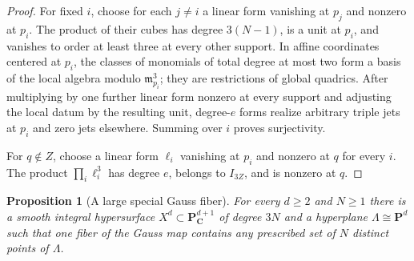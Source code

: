 \documentclass[11pt]{article}
\newtheorem{proposition}[theorem]{Proposition}
\newcommand{\PP}{\mathbf P}
\newcommand{\CC}{\mathbf C}
\begin{document}
\begin{proof}
For fixed $i$, choose for each $j\neq i$ a linear form vanishing at $p_j$
and nonzero at $p_i$.  The product of their cubes has degree $3(N-1)$, is a
unit at $p_i$, and vanishes to order at least three at every other support.
In affine coordinates centered at $p_i$, the classes of monomials of total
degree at most two form a basis of the local algebra modulo
$\mathfrak m_{p_i}^3$; they are restrictions of global quadrics.  After
multiplying by one further linear form nonzero at every support and adjusting
the local datum by the resulting unit, degree-$e$ forms realize arbitrary
triple jets at $p_i$ and zero jets elsewhere.  Summing over $i$ proves
surjectivity.

For $q\notin Z$, choose a linear form $\ell_i$ vanishing at $p_i$ and
nonzero at $q$ for every $i$.  The product $\prod_i\ell_i^3$ has degree $e$,
belongs to $I_{3Z}$, and is nonzero at $q$.
\end{proof}

\begin{proposition}[A large special Gauss fiber]\label{prop:hypersurface}
For every $d\geq2$ and $N\geq1$ there is a smooth integral hypersurface
$X^d\subset\PP^{d+1}_{\CC}$ of degree $3N$ and a hyperplane
$\Lambda\cong\PP^d$ such that one fiber of the Gauss map contains any
prescribed set of $N$ distinct points of $\Lambda$.
\end{proposition}
\end{document}
